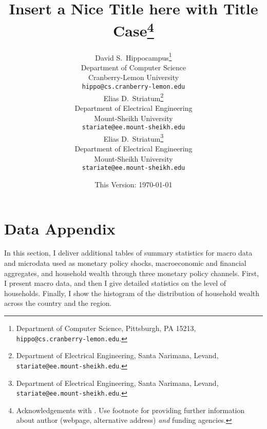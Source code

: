 \documentclass[11pt]{article}
\date{This Version: \today}
\title{Insert a Nice Title here with Title Case\thanks{Acknowledgements with \lipsum[2]. Use footnote for providing further information about author (webpage, alternative address) \emph{and} funding agencies.}}
\author{
    {David S.~Hippocampus}\thanks{Department of Computer Science, Pittsburgh, PA 15213, \texttt{hippo@cs.cranberry-lemon.edu}.} \\
    Department of Computer Science\\
    Cranberry-Lemon University\\
    \texttt{hippo@cs.cranberry-lemon.edu} \\
    \And
    {Elias D.~Striatum}\thanks{Department of Electrical Engineering, Santa Narimana, Levand, \texttt{stariate@ee.mount-sheikh.edu}.} \\
    Department of Electrical Engineering\\
    Mount-Sheikh University\\
    \texttt{stariate@ee.mount-sheikh.edu} \\
    \AND
    {Elias D.~Striatum}\thanks{Department of Electrical Engineering, Santa Narimana, Levand, \texttt{stariate@ee.mount-sheikh.edu}.} \\
    Department of Electrical Engineering\\
    Mount-Sheikh University\\
    \texttt{stariate@ee.mount-sheikh.edu} \\
}
\newcommand*{\RefsPath}{../references}
\newcommand*{\RefsPath}{docs/references}
\begin{document}
\maketitle

\renewcommand{\thefootnote}{\arabic{footnote}}
\setcounter{footnote}{0}


\tableofcontents
\listoftodos

\clearpage
\newpage


\appendix
\renewcommand*{\thepage}{A\arabic{page}}
\renewcommand{\thetable}{A\arabic{table}}
\renewcommand{\thefigure}{A\arabic{figure}}

\vspace{-3em}

\tableofcontents	

\section{Data Appendix}\label{app:b}
In this section, I deliver additional tables of summary statistics for macro data and microdata used as monetary policy shocks, macroeconomic and financial aggregates, and household wealth through three monetary policy channels. First, I present macro data, and then I give detailed statistics on the level of households. Finally, I show the histogram of the distribution of household wealth across the country and the region. 


\clearpage\newpage

%

\clearpage

\end{document}
